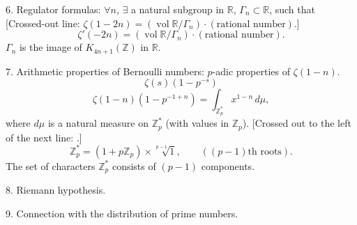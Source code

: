 6. Regulator formulas: $\forall n$, $\exists$ a natural subgroup in $\mathbb R$,
$\Gamma_n\subset\mathbb R$, such that
[Crossed-out line: $\zeta(1-2n)=(\operatorname{vol}\mathbb R/\Gamma_n)\cdot(\text{rational number})$.]
\begin{equation*}
\zeta'(-2n)=(\operatorname{vol}\mathbb R/\Gamma_n)\cdot(\text{rational number}).
\end{equation*}
$\Gamma_n$ is the image of $K_{4n+1}(\mathbb Z)$ in $\mathbb R$.

7. Arithmetic properties of Bernoulli numbers: $p$-adic properties of $\zeta(1-n)$.
\begin{equation*}
\zeta(s)(1-p^{-s})
\end{equation*}
\begin{equation*}
\zeta(1-n)(1-p^{-1+n})=\int_{\mathbb Z_p^*}x^{1-n}\,d\mu,
\end{equation*}
where $d\mu$ is a natural measure on $\mathbb Z_p^*$ (with values in $\mathbb Z_p$).
[Crossed out to the left of the next line: .]
\begin{equation*}
\mathbb Z_p^*=(1+p\mathbb Z_p)\times\sqrt[p-1]{1},\qquad ((p-1)\text{th roots}).
\end{equation*}
The set of characters  $\mathbb Z_p^*$ consists of $(p-1)$ components.

8. Riemann hypothesis.

9. Connection with the distribution of prime numbers.


